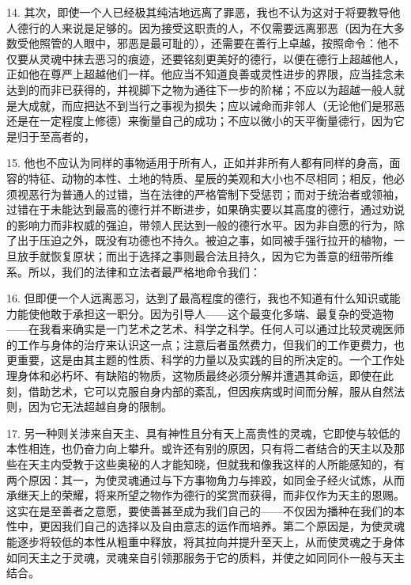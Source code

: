 14. 其次，即使一个人已经极其纯洁地远离了罪恶，我也不认为这对于将要教导他人德行的人来说是足够的。因为接受这职责的人，不仅需要远离邪恶（因为在大多数受他照管的人眼中，邪恶是最可耻的），还需要在善行上卓越，按照命令：他不仅要从灵魂中抹去恶习的痕迹，还要铭刻更美好的德行，以便在德行上超越他人，正如他在尊严上超越他们一样。他应当不知道良善或灵性进步的界限，应当挂念未达到的而非已获得的，并视脚下之物为通往下一步的阶梯；不应以为超越一般人就是大成就，而应把达不到当行之事视为损失；应以诫命而非邻人（无论他们是邪恶还是在一定程度上修德）来衡量自己的成功；不应以微小的天平衡量德行，因为它是归于至高者的，\par

15. 他也不应认为同样的事物适用于所有人，正如并非所有人都有同样的身高，面容的特征、动物的本性、土地的特质、星辰的美观和大小也不尽相同；相反，他必须视恶行为普通人的过错，当在法律的严格管制下受惩罚；而对于统治者或领袖，过错在于未能达到最高的德行并不断进步，如果确实要以其高度的德行，通过劝说的影响力而非权威的强迫，带领人民达到一般的德行水平。因为非自愿的行为，除了出于压迫之外，既没有功德也不持久。被迫之事，如同被手强行拉开的植物，一旦放手就恢复原状；而出于选择之事则最合法且持久，因为它为善意的纽带所维系。所以，我们的法律和立法者最严格地命令我们：\par

16. 但即便一个人远离恶习，达到了最高程度的德行，我也不知道有什么知识或能力能使他敢于承担这一职分。因为引导人——这个最变化多端、最复杂的受造物——在我看来确实是一门艺术之艺术、科学之科学。任何人可以通过比较灵魂医师的工作与身体的治疗来认识这一点；注意后者虽然费力，但我们的工作更费力，也更重要，这是由其主题的性质、科学的力量以及实践的目的所决定的。一个工作处理身体和必朽坏、有缺陷的物质，这物质最终必须分解并遭遇其命运，即使在此刻，借助艺术，它可以克服自身内部的紊乱，但因疾病或时间而分解，服从自然法则，因为它无法超越自身的限制。\par

17. 另一种则关涉来自天主、具有神性且分有天上高贵性的灵魂，它即使与较低的本性相连，也仍奋力向上攀升。或许还有别的原因，只有将二者结合的天主以及那些在天主内受教于这些奥秘的人才能知晓，但就我和像我这样的人所能感知的，有两个原因：其一，为使灵魂通过与下方事物角力与摔跤，如同金子经火试炼，从而承继天上的荣耀，将来所望之物作为德行的奖赏而获得，而非仅作为天主的恩赐。这实在是至善者之意愿，要使善甚至成为我们自己的——不仅因为播种在我们的本性中，更因我们自己的选择以及自由意志的运作而培养。第二个原因是，为使灵魂能逐步将较低的本性从粗重中释放，将其拉向并提升至天上，从而使灵魂之于身体如同天主之于灵魂，灵魂亲自引领那服务于它的质料，并使之如同同仆一般与天主结合。\par

